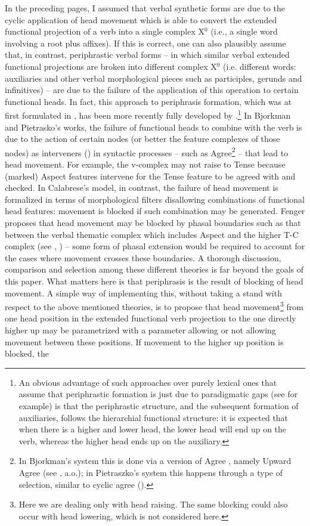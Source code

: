 \documentclass[output=paper]{langscibook}
\begin{document}
In the preceding pages, I assumed that verbal synthetic forms are due to the cyclic application of head movement which is able to convert the extended functional projection of a verb into a single complex X$^0$ (i.e., a single word involving a root plus affixes). If this is correct, one can also plausibly assume that, in contrast, periphrastic verbal forms  --  in which similar verbal extended functional projections are broken into different complex X$^0$ (i.e. different words: auxiliaries and other verbal morphological pieces such as participles, gerunds and infinitives)  --  are due to the failure of the application of this operation to certain functional heads. In fact, this approach to periphrasis formation, which was at first formulated in \cite{embick2000a}, has been more recently fully developed by \cite{bjorkman2011a, pietraszko2016a, fenger2020a, calabrese2019a}.\footnote{An obvious advantage of such approaches over purely lexical ones that assume that periphrastic formation is just due to paradigmatic gaps (see \cite{kiparsky2004a} for example) is that the periphrastic structure, and the subsequent formation of auxiliaries, follows the hierarchial functional structure: it is expected that when there is a higher and lower head, the lower head will end up on the verb, whereas the higher head ends up on the auxiliary.}  In Bjorkman and Pietrasko’s works, the failure of functional heads to combine with the verb is due to the action of certain nodes (or better the feature complexes of those nodes) as interveners (\cite{rizzi1990a}) in syntactic processes  --  such as Agree\footnote{In Bjorkman’s system this is done via a version of Agree \citep{chomsky2000a, Chomsky01}, namely Upward Agree (see \cite{merchant2011a}, a.o.); in Pietraszko’s system this happens through a type of selection, similar to cyclic agree (\cite{bejar2009a}).}   --  that lead to head movement. For example, the v-complex may not raise to Tense because (marked) Aspect features intervene for the Tense feature to be agreed with and checked. In Calabrese’s model, in contrast, the failure of head movement is formalized in terms of morphological filters disallowing combinations of functional head features: movement is blocked if such combination may be generated. Fenger proposes that head movement may be blocked by phasal boundaries such as that between the verbal thematic complex which includes Aspect and the higher T-C complex (see \cite{bo2014a}, \cite{wurmbrand2017verb})  --  some form of phasal extension would be required to account for the cases where movement crosses these boundaries.  A thorough discussion, comparison and selection among these different theories is far beyond the goals of this paper.  What matters here is that periphrasis is the result of blocking of head movement. A simple way of implementing this, without taking a stand with respect to the above mentioned theories, is to propose that head movement\footnote{Here we are dealing only with head raising. The same blocking could also occur with head lowering, which is not considered here.}  from one head position in the extended functional verb projection to the one directly higher up may be parametrized with a parameter allowing or not allowing movement between these positions. If movement to the higher up position is blocked, the 
\end{document}
